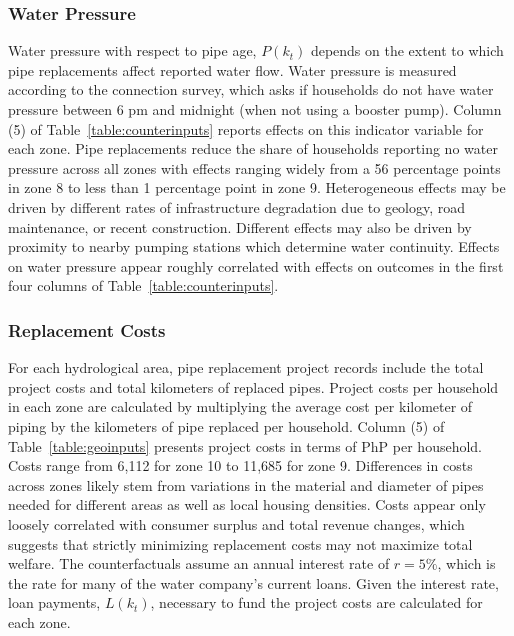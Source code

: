 \documentclass[12pt,table]{article}
\begin{document}
\subsubsection{Water Pressure}\label{section:counterpress}

Water pressure with respect to pipe age, $P(k_{t})$ depends on the extent to which pipe replacements affect reported water flow.  Water pressure is measured according to the connection survey, which asks if households do not have water pressure between 6 pm and midnight (when not using a booster pump).  Column (5) of Table~\ref{table:counterinputs} reports effects on this indicator variable for each zone.  Pipe replacements reduce the share of households reporting no water pressure across all zones with effects ranging widely from a 56 percentage points in zone 8 to less than 1 percentage point in zone 9.  Heterogeneous effects may be driven by different rates of infrastructure degradation due to geology, road maintenance, or recent construction.  Different effects may also be driven by proximity to nearby pumping stations which determine water continuity.  Effects on water pressure appear roughly correlated with effects on outcomes in the first four columns of Table~\ref{table:counterinputs}.

\subsubsection{Replacement Costs}\label{section:counterrep}

For each hydrological area, pipe replacement project records include the total project costs and total kilometers of replaced pipes.  Project costs per household in each zone are calculated by multiplying the average cost per kilometer of piping by the kilometers of pipe replaced per household.   Column (5) of Table~\ref{table:geoinputs} presents project costs in terms of PhP per household.  Costs range from 6,112 for zone 10 to 11,685 for zone 9.  Differences in costs across zones likely stem from variations in the material and diameter of pipes needed for different areas as well as local housing densities.  Costs appear only loosely correlated with consumer surplus and total revenue changes, which suggests that strictly minimizing replacement costs may not maximize total welfare.  The counterfactuals assume an annual interest rate of $r=5\%$, which is the rate for many of the water company's current loans.  Given the interest rate, loan payments, $L(k_t)$, necessary to fund the project costs are calculated for each zone.  
\end{document}
